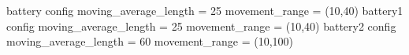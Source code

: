battery   config moving_average_length = 25  movement_range =  (10,40)
battery1  config moving_average_length = 25  movement_range =  (10,40)
battery2  config moving_average_length = 60  movement_range = (10,100)
